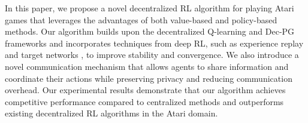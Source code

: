 In this paper, we propose a novel decentralized RL algorithm for playing Atari games that leverages the advantages of both value-based and policy-based methods. Our algorithm builds upon the decentralized Q-learning and Dec-PG frameworks and incorporates techniques from deep RL, such as experience replay \citep{mnih2013playing} and target networks \citep{hasselt2015deep}, to improve stability and convergence. We also introduce a novel communication mechanism that allows agents to share information and coordinate their actions while preserving privacy and reducing communication overhead. Our experimental results demonstrate that our algorithm achieves competitive performance compared to centralized methods and outperforms existing decentralized RL algorithms in the Atari domain.